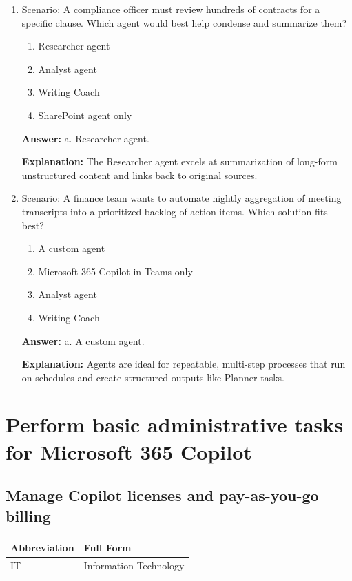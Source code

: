\documentclass[10pt]{article}
\begin{document}
\begin{enumerate}[leftmargin=*]
\item Scenario: A compliance officer must review hundreds of contracts for a specific clause. Which agent would best help condense and summarize them?
\begin{enumerate}[label=\alph*., leftmargin=1.5em]
\item Researcher agent
\item Analyst agent
\item Writing Coach
\item SharePoint agent only
\end{enumerate}
\textbf{Answer:} a. Researcher agent.

\textbf{Explanation:} The Researcher agent excels at summarization of long-form unstructured content and links back to original sources.

\item Scenario: A finance team wants to automate nightly aggregation of meeting transcripts into a prioritized backlog of action items. Which solution fits best?
\begin{enumerate}[label=\alph*., leftmargin=1.5em]
\item A custom agent
\item Microsoft 365 Copilot in Teams only
\item Analyst agent
\item Writing Coach
\end{enumerate}
\textbf{Answer:} a. A custom agent.

\textbf{Explanation:} Agents are ideal for repeatable, multi-step processes that run on schedules and create structured outputs like Planner tasks.

\end{enumerate}
\clearpage
\section{Perform basic administrative tasks for Microsoft 365 Copilot}
\clearpage
\subsection{Manage Copilot licenses and pay-as-you-go billing}

\begin{center}
\begin{tabular}{>{\raggedright\arraybackslash}p{} >{\raggedright\arraybackslash}p{}}
\toprule
\textbf{Abbreviation} & \textbf{Full Form} \\
\midrule
IT & Information Technology \\
\end{tabular}
\end{center}
\end{document}
